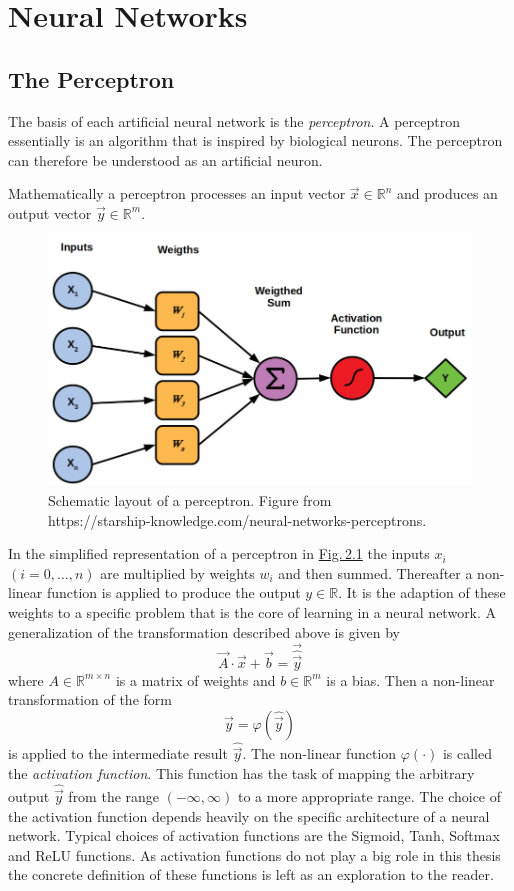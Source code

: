 \section{Neural Networks}
\subsection{The Perceptron}
The basis of each artificial neural network is the \textit{perceptron}. A perceptron essentially is an algorithm that is inspired by biological neurons. The perceptron can therefore be understood as an artificial neuron.

Mathematically a perceptron processes an input vector $\vec{x}\in\mathbb{R}^n$ and produces an output vector $\vec{y}\in\mathbb{R}^m$. 
%
\begin{figure} \label{fig:2.1}
    \centering
    \includegraphics[width=.5\textwidth]{Chapters/figures/perceptron.PNG}
    \caption[Schematic layout of a perceptron]{Schematic layout of a perceptron. Figure from\\ https://starship-knowledge.com/neural-networks-perceptrons.}
\end{figure}
%
In the simplified representation of a perceptron in \hyperref[fig:2.1]{Fig.\,2.1} the inputs $x_i$ $ (i=0,\dots,n)$ are multiplied by weights $w_i$ and then summed. Thereafter a non-linear function is applied to produce the output $y\in\mathbb{R}$. It is the adaption of these weights to a specific problem that is the core of learning in a neural network. A generalization of the transformation described above is given by
%
\begin{equation} \label{equ:2.1}
    \vec{A}\cdot\vec{x}+\vec{b}=\vec{\hat{\vec{y}}}
\end{equation}
%
where $A\in\mathbb{R}^{m\times n}$ is a matrix of weights and $b\in\mathbb{R}^m$ is a bias. Then a non-linear transformation of the form
%
\begin{equation} \label{equ:2.2}
    \vec{y}=\varphi(\hat{\vec{y}})
\end{equation}
%
is applied to the intermediate result $\hat{\vec{y}}$. The non-linear function $\varphi(\cdot)$ is called the \textit{activation function}. This function has the task of mapping the arbitrary output $\hat{\vec{y}}$ from the range $(-\infty,\infty)$ to a more appropriate range. The choice of the activation function depends heavily on the specific architecture of a neural network. Typical choices of activation functions are the Sigmoid, Tanh, Softmax and ReLU functions. As activation functions do not play a big role in this thesis the concrete definition of these functions is left as an exploration to the reader.
%
